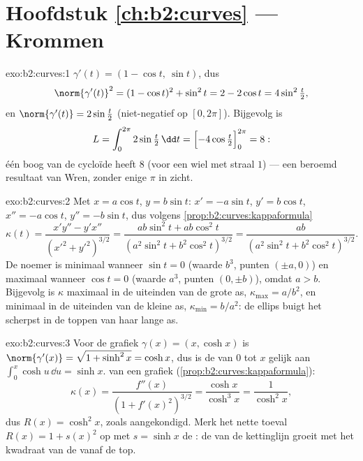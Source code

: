 \section*{Hoofdstuk \ref{ch:b2:curves} --- Krommen}

\begin{solution}{exo:b2:curves:1}
$\gamma'(t) = (1 - \cos t,\ \sin t)$, dus
\[
\norm{\gamma'(t)}^2 = (1 - \cos t)^2 + \sin^2 t
= 2 - 2\cos t = 4\sin^2\tfrac t2 ,
\]
en $\norm{\gamma'(t)} = 2\sin\frac t2$ (niet-negatief op $[0,
2\pi]$). Bijgevolg is
\[
L = \int_0^{2\pi} 2\sin\tfrac t2\,\dd t
= \Bigl[-4\cos\tfrac t2\Bigr]_0^{2\pi} = 8 :
\]
één boog van de cycloïde heeft  $8$ (voor een wiel met straal
$1$) --- een beroemd resultaat van Wren, zonder enige $\pi$ in
zicht.
\end{solution}

\begin{solution}{exo:b2:curves:2}
Met $x = a\cos t$, $y = b\sin t$: $x' = -a\sin t$, $y' = b\cos t$,
$x'' = -a\cos t$, $y'' = -b\sin t$, dus volgens
\cref{prop:b2:curves:kappaformula}
\[
\kappa(t)
= \frac{x'y'' - y'x''}{(x'^2 + y'^2)^{3/2}}
= \frac{ab\sin^2 t + ab\cos^2 t}
       {(a^2\sin^2 t + b^2\cos^2 t)^{3/2}}
= \frac{ab}{(a^2\sin^2 t + b^2\cos^2 t)^{3/2}} .
\]
De noemer is minimaal wanneer $\sin t = 0$ (waarde $b^3$, punten
$(\pm a, 0)$) en maximaal wanneer $\cos t = 0$ (waarde $a^3$,
punten $(0, \pm b)$), omdat $a > b$. Bijgevolg is $\kappa$ maximaal
in de uiteinden van de grote as, $\kappa_{\max} = a/b^2$, en
minimaal in de uiteinden van de kleine as, $\kappa_{\min} = b/a^2$:
de ellips buigt het scherpst in de toppen van haar lange as.
\end{solution}

\begin{solution}{exo:b2:curves:3}
Voor de grafiek $\gamma(x) = (x, \cosh x)$ is $\norm{\gamma'(x)} =
\sqrt{1 + \sinh^2 x} = \cosh x$, dus is de  van $0$ tot
$x$ gelijk aan $\int_0^x \cosh u\,\dd u = \sinh x$.  van
een grafiek (\cref{prop:b2:curves:kappaformula}):
\[
\kappa(x) = \frac{f''(x)}{(1 + f'(x)^2)^{3/2}}
= \frac{\cosh x}{\cosh^3 x} = \frac{1}{\cosh^2 x} ,
\]
dus $R(x) = \cosh^2 x$, zoals aangekondigd. Merk het nette
toeval $R(x) = 1 + s(x)^2$ op met $s = \sinh x$ de : de
 van de kettinglijn groeit met het kwadraat van de
 vanaf de top.
\end{solution}

